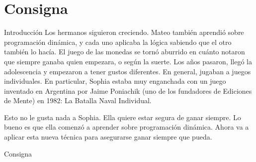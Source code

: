 \section*{Consigna}


{\Large Introducción}
\vskip0.5cm
Los hermanos siguieron creciendo. Mateo también aprendió sobre programación dinámica, y cada uno aplicaba la lógica sabiendo que el otro también lo hacía. El juego de las monedas se tornó aburrido en cuánto notaron que siempre ganaba quien empezara, o según la suerte. Los años pasaron, llegó la adolescencia y empezaron a tener gustos diferentes. En general, jugaban a juegos individuales. En particular, Sophia estaba muy enganchada con un juego inventado en Argentina por Jaime Poniachik (uno de los fundadores de Ediciones de Mente) en 1982: La Batalla Naval Individual.

Esto no le gusta nada a Sophia. Ella quiere estar segura de ganar siempre. Lo bueno es que ella comenzó a aprender sobre programación dinámica. Ahora va a aplicar esta nueva técnica para asegurarse ganar siempre que pueda.

\vskip0.5cm
{\Large Consigna}
\vskip0.5cm

